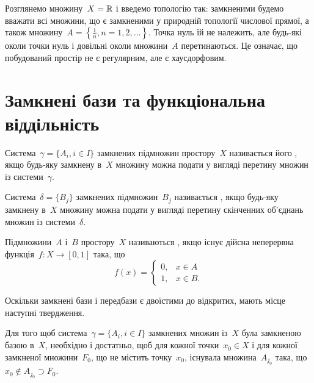 \begin{example}
    Розглянемо множину~$X = \mathbb{R}$ і введемо топологію так: замкненими будемо вважати всі множини, що є замкненими у природній топології числової прямої, а також множину~$A = \left\{ \frac1n, n = 1, 2, \ldots \right\}$. Точка нуль їй не належить, але будь-які околи точки нуль і довільні околи множини~$A$ перетинаються. Це означає, що побудований простір не є регулярним, але є хаусдорфовим.
\end{example}

\section{Замкнені бази та функціональна віддільність}

\begin{definition}
    Система~$\gamma = \{ A_i, i \in I\}$ замкнених підмножин простору~$X$ називається його , якщо будь-яку замкнену в~$X$ множину можна подати у вигляді перетину множин із системи~$\gamma$.
\end{definition}

\begin{definition}
    Система~$\delta = \{B_j\}$ замкнених підмножин~$B_j$ називається , якщо будь-яку замкнену в~$X$ множину можна подати у вигляді перетину скінченних об'єднань множин із системи~$\delta$.
\end{definition}

\begin{definition}
    Підмножини~$A$ і~$B$ простору~$X$ називаються , якщо існує дійсна неперервна функція~$f: X \to [0, 1]$ така, що \[ f(x) = \begin{cases} 0, & x \in A \\ 1, & x \in B. \end{cases} \]
\end{definition}

Оскільки замкнені бази і передбази є двоїстими до відкритих, мають місце наступні твердження.

\begin{lemma}
    Для того щоб система~$\gamma = \{A_i, i \in I\}$ замкнених множин із~$X$ була замкненою базою в~$X$, необхідно і достатньо, щоб для кожної точки~$x_0 \in X$ і для кожної замкненої множини~$F_0$, що не містить точку~$x_0$, існувала множина~$A_{j_0}$ така, що~$x_0 \notin A_{j_0} \supset F_0$.
\end{lemma}

